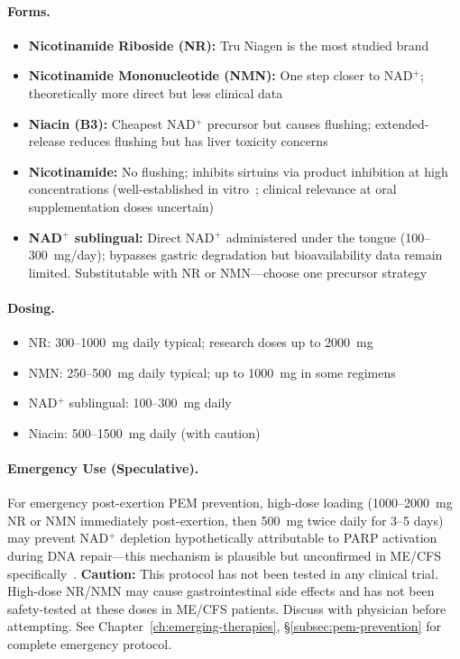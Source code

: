 \paragraph{Forms.}
\begin{itemize}
    \item \textbf{Nicotinamide Riboside (NR):} Tru Niagen is the most studied brand
    \item \textbf{Nicotinamide Mononucleotide (NMN):} One step closer to NAD$^+$; theoretically more direct but less clinical data
    \item \textbf{Niacin (B3):} Cheapest NAD$^+$ precursor but causes flushing; extended-release reduces flushing but has liver toxicity concerns
    \item \textbf{Nicotinamide:} No flushing; inhibits sirtuins via product inhibition at high concentrations (well-established in vitro~\cite{Bitterman2002Nicotinamide}; clinical relevance at oral supplementation doses uncertain)
    \item \textbf{NAD$^+$ sublingual:} Direct NAD$^+$ administered under the tongue (100--300~mg/day); bypasses gastric degradation but bioavailability data remain limited. Substitutable with NR or NMN---choose one precursor strategy
\end{itemize}

\paragraph{Dosing.}
\begin{itemize}
    \item NR: 300--1000~mg daily typical; research doses up to 2000~mg
    \item NMN: 250--500~mg daily typical; up to 1000~mg in some regimens
    \item NAD$^+$ sublingual: 100--300~mg daily
    \item Niacin: 500--1500~mg daily (with caution)
\end{itemize}

\paragraph{Emergency Use (Speculative).} For emergency post-exertion PEM prevention, high-dose loading (1000--2000~mg NR or NMN immediately post-exertion, then 500~mg twice daily for 3--5 days) may prevent NAD$^+$ depletion hypothetically attributable to PARP activation during DNA repair---this mechanism is plausible but unconfirmed in ME/CFS specifically~\cite{Dehhaghi2022AD}. \textbf{Caution:} This protocol has not been tested in any clinical trial. High-dose NR/NMN may cause gastrointestinal side effects and has not been safety-tested at these doses in ME/CFS patients. Discuss with physician before attempting. See Chapter~\ref{ch:emerging-therapies}, \S\ref{subsec:pem-prevention} for complete emergency protocol.


